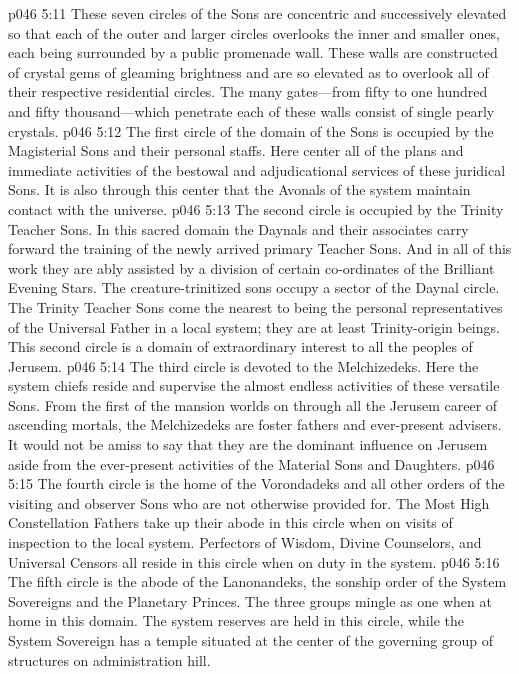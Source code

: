 \vs p046 5:11 These seven circles of the Sons are concentric and successively elevated so that each of the outer and larger circles overlooks the inner and smaller ones, each being surrounded by a public promenade wall. These walls are constructed of crystal gems of gleaming brightness and are so elevated as to overlook all of their respective residential circles. The many gates---from fifty to one hundred and fifty thousand---which penetrate each of these walls consist of single pearly crystals.\plusone
\vs p046 5:12 The first circle of the domain of the Sons is occupied by the Magisterial Sons and their personal staffs. Here center all of the plans and immediate activities of the bestowal and adjudicational services of these juridical Sons. It is also through this center that the Avonals of the system maintain contact with the universe.
\vs p046 5:13 The second circle is occupied by the Trinity Teacher Sons. In this sacred domain the Daynals and their associates carry forward the training of the newly arrived primary Teacher Sons. And in all of this work they are ably assisted by a division of certain co\hyp{}ordinates of the Brilliant Evening Stars. The creature\hyp{}trinitized sons occupy a sector of the Daynal circle. The Trinity Teacher Sons come the nearest to being the personal representatives of the Universal Father in a local system; they are at least Trinity\hyp{}origin beings. This second circle is a domain of extraordinary interest to all the peoples of Jerusem.
\vs p046 5:14 The third circle is devoted to the Melchizedeks. Here the system chiefs reside and supervise the almost endless activities of these versatile Sons. From the first of the mansion worlds on through all the Jerusem career of ascending mortals, the Melchizedeks are foster fathers and ever\hyp{}present advisers. It would not be amiss to say that they are the dominant influence on Jerusem aside from the ever\hyp{}present activities of the Material Sons and Daughters.
\vs p046 5:15 The fourth circle is the home of the Vorondadeks and all other orders of the visiting and observer Sons who are not otherwise provided for. The Most High Constellation Fathers take up their abode in this circle when on visits of inspection to the local system. Perfectors of Wisdom, Divine Counselors, and Universal Censors all reside in this circle when on duty in the system.
\vs p046 5:16 The fifth circle is the abode of the Lanonandeks, the sonship order of the System Sovereigns and the Planetary Princes. The three groups mingle as one when at home in this domain. The system reserves are held in this circle, while the System Sovereign has a temple situated at the center of the governing group of structures on administration hill.
